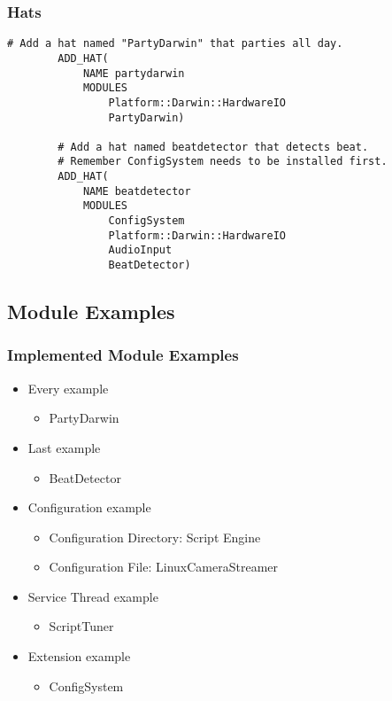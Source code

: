 \documentclass{beamer}
\begin{document}
\begin{frame}[fragile]
	\frametitle{Hats}
	\begin{lstlisting}[language=nuclear-cmake]
		# Add a hat named "PartyDarwin" that parties all day.
		ADD_HAT(
		    NAME partydarwin
		    MODULES
		        Platform::Darwin::HardwareIO
		        PartyDarwin)

		# Add a hat named beatdetector that detects beat.
		# Remember ConfigSystem needs to be installed first.
		ADD_HAT(
		    NAME beatdetector
		    MODULES
		        ConfigSystem
		        Platform::Darwin::HardwareIO
		        AudioInput
		        BeatDetector)

	\end{lstlisting}
\end{frame}

\subsection{Module Examples}
\begin{frame}
	\frametitle{Implemented Module Examples}
	\begin{itemize}
		\item Every example
			\begin{itemize}
				\item PartyDarwin
			\end{itemize}

		\item Last example
			\begin{itemize}
				\item BeatDetector
			\end{itemize}

		\item Configuration example
			\begin{itemize}
				\item Configuration Directory: Script Engine
				\item Configuration File: LinuxCameraStreamer
			\end{itemize}

		\item Service Thread example
			\begin{itemize}
				\item ScriptTuner
			\end{itemize}

		\item Extension example
			\begin{itemize}
				\item ConfigSystem
			\end{itemize}
	\end{itemize}
\end{frame}
\end{document}
